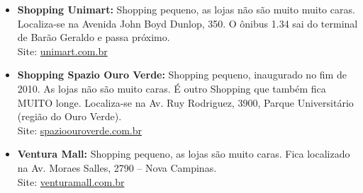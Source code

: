 \begin{itemize}
    \item   \textbf{Shopping Unimart:} Shopping pequeno, as lojas não são muito
        muito caras. Localiza-se na Avenida John Boyd Dunlop, 350. O ônibus
        1.34 sai do terminal de Barão Geraldo e passa próximo.
        \\Site: \url{unimart.com.br}

    \item   \textbf{Shopping Spazio Ouro Verde:} Shopping pequeno, inaugurado
        no fim de 2010. As lojas não são muito caras. É outro Shopping que
        também fica MUITO longe. Localiza-se na Av. Ruy Rodriguez, 3900,
        Parque Universitário (região do Ouro Verde).
        \\Site: \url{spazioouroverde.com.br}

    \item   \textbf{Ventura Mall:} Shopping pequeno, as lojas são muito caras.
        Fica localizado na Av. Moraes Salles, 2790 -- Nova Campinas.
        \\Site: \url{venturamall.com.br}
\end{itemize}

